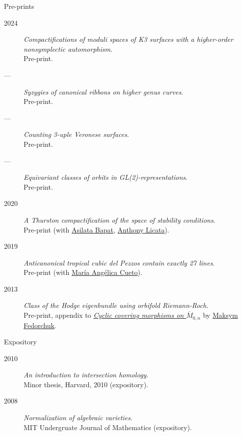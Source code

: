 \documentclass[11pt]{article}
\begin{document}
\begin{description}
\item[{Pre-prints}] 
\end{description}
\label{org1fb2704}
\begin{description}
\item[{2024}] \emph{Compactifications of moduli spaces of K3 surfaces with a higher-order nonsymplectic automorphism}.\\
Pre-print.
\item[{---}] \emph{Syzygies of canonical ribbons on higher genus curves}.\\
Pre-print.
\item[{---}] \emph{Counting 3-uple Veronese surfaces}.\\
Pre-print.
\item[{---}] \emph{Equivariant classes of orbits in GL(2)-representations}.\\
Pre-print.
\item[{2020}] \emph{A Thurston compactification of the space of stability conditions}.\\
Pre-print (with \href{https://asilata.org/}{Asilata Bapat}, \href{https://maths-people.anu.edu.au/\~licatat/}{Anthony Licata}).
\item[{2019}] \emph{Anticanonical tropical cubic del Pezzos contain exactly 27 lines}.\\
Pre-print (with \href{https://people.math.osu.edu/cueto.5/}{María Angélica Cueto}).
\item[{2013}] \emph{Class of the Hodge eigenbundle using orbifold Riemann-Roch}.\\
Pre-print, appendix to \href{https://drive.google.com/file/d/1wq-Fh3DiqODc51t-J0phIexVF7B4lxsY/view}{\emph{Cyclic covering morphisms on \(\overline M_{0,n}\)}} by \href{https://www2.bc.edu/maksym-fedorchuk/}{Maksym Fedorchuk}.
\end{description}

\begin{description}
\item[{Expository}] 
\end{description}
\label{orge144d30}
\begin{description}
\item[{2010}] \emph{An introduction to intersection homology}.\\
Minor thesis, Harvard, 2010 (expository).
\item[{2008}] \emph{Normalization of algebraic varieties}.\\
MIT Undergruate Journal of Mathematics (expository).
\end{description}
\end{document}
